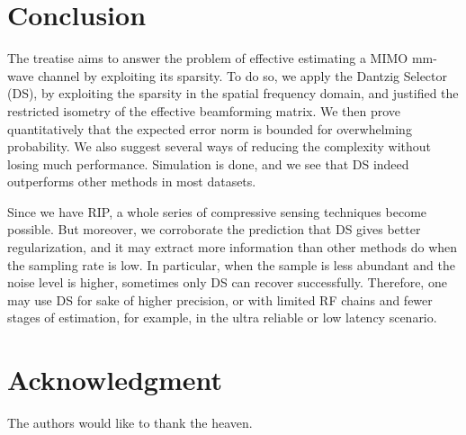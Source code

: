\documentclass[journal]{IEEEtran}
\begin{document}

\section{Conclusion}

The treatise aims to answer the problem of effective estimating a MIMO mm-wave channel by exploiting its sparsity.
To do so, we apply the Dantzig Selector (DS), by exploiting the sparsity in the spatial frequency domain, and justified the restricted isometry of the effective beamforming matrix.
We then prove quantitatively that the expected error norm is bounded for overwhelming probability.
We also suggest several ways of reducing the complexity without losing much performance.
Simulation is done, and we see that DS indeed outperforms other methods in most datasets.

Since we have RIP, a whole series of compressive sensing techniques become possible.
But moreover, we corroborate the prediction that DS gives better regularization, and it may extract more information than other methods do when the sampling rate is low.
In particular, when the sample is less abundant and the noise level is higher, sometimes only DS can recover successfully.
Therefore, one may use DS for sake of higher precision, or with limited RF chains and fewer stages of estimation, for example, in the ultra reliable or low latency scenario.

\section*{Acknowledgment}

The authors would like to thank the heaven.

\end{document}
